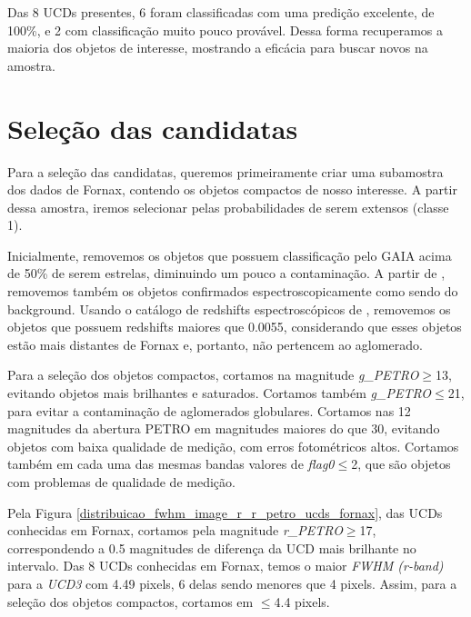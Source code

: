 Das 8 UCDs presentes, 6 foram classificadas com uma predição excelente, de 100\%, e 2 com classificação muito pouco provável. Dessa forma recuperamos a maioria dos objetos de interesse, mostrando a eficácia para buscar novos na amostra.

\section{Seleção das candidatas}\label{cap:selecao_candidatas}
Para a seleção das candidatas, queremos primeiramente criar uma subamostra dos dados de Fornax, contendo os objetos compactos de nosso interesse. A partir dessa amostra, iremos selecionar pelas probabilidades de serem extensos (classe 1).

\vspace{\baselineskip}

Inicialmente, removemos os objetos que possuem classificação pelo GAIA acima de 50\% de serem estrelas, diminuindo um pouco a contaminação. A partir de \cite{Su_2021}, removemos também os objetos confirmados espectroscopicamente como sendo do background. Usando o catálogo de redshifts espectroscópicos de \cite{Lima_2024}, removemos os objetos que possuem redshifts maiores que 0.0055, considerando que esses objetos estão mais distantes de Fornax e, portanto, não pertencem ao aglomerado.

\vspace{\baselineskip}

Para a seleção dos objetos compactos, cortamos na magnitude \textit{g\_PETRO}$\geq$13, evitando objetos mais brilhantes e saturados. Cortamos também \textit{g\_PETRO}$\leq$21, para evitar a contaminação de aglomerados globulares. Cortamos nas 12 magnitudes da abertura PETRO em magnitudes maiores do que 30, evitando objetos com baixa qualidade de medição, com erros fotométricos altos. Cortamos também em cada uma das mesmas bandas valores de \textit{flag0}$\leq$2, que são objetos com problemas de qualidade de medição.

\vspace{\baselineskip}

Pela Figura \ref{distribuicao_fwhm_image_r_r_petro_ucds_fornax}, das UCDs conhecidas em Fornax, cortamos pela magnitude \textit{r\_PETRO}$\geq$17, correspondendo a 0.5 magnitudes de diferença da UCD mais brilhante no intervalo. 
Das 8 UCDs conhecidas em Fornax, temos o maior \textit{FWHM (r-band)} para a \textit{UCD3} com 4.49 pixels, 6 delas sendo menores que 4 pixels. Assim, para a seleção dos objetos compactos, cortamos em $\leq$4.4 pixels.

